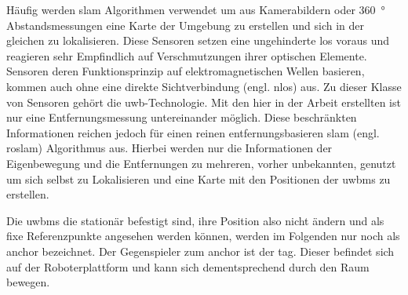 Häufig werden \Gls{slam} Algorithmen verwendet um aus Kamerabildern oder \SI{360}{\degree} Abstandsmessungen eine Karte der Umgebung zu erstellen und sich in der gleichen zu lokalisieren. Diese Sensoren setzen eine ungehinderte \Gls{los} voraus und reagieren sehr Empfindlich auf Verschmutzungen ihrer optischen Elemente. Sensoren deren Funktionsprinzip auf elektromagnetischen Wellen basieren, kommen auch ohne eine direkte Sichtverbindung (engl. \Gls{nlos}) aus. Zu dieser Klasse von Sensoren gehört die \Gls{uwb}-Technologie. Mit den hier in der Arbeit erstellten  ist nur eine Entfernungsmessung untereinander möglich. Diese beschränkten Informationen reichen jedoch für einen reinen entfernungsbasieren \Gls{slam} (engl. \gls{roslam}) Algorithmus aus. Hierbei werden nur die Informationen der Eigenbewegung und die Entfernungen zu mehreren, vorher unbekannten,  genutzt um sich selbst zu Lokalisieren und eine Karte mit den Positionen der \Glspl{uwbm} zu erstellen.

Die \Glspl{uwbm} die stationär befestigt sind, ihre Position also nicht ändern und als fixe Referenzpunkte angesehen werden können, werden im Folgenden nur noch als \Gls{anchor} bezeichnet. Der Gegenspieler zum \Gls{anchor} ist der \Gls{tag}. Dieser befindet sich auf der Roboterplattform und kann sich dementsprechend durch den Raum bewegen.



%
%
%


%
%
%


%
%
